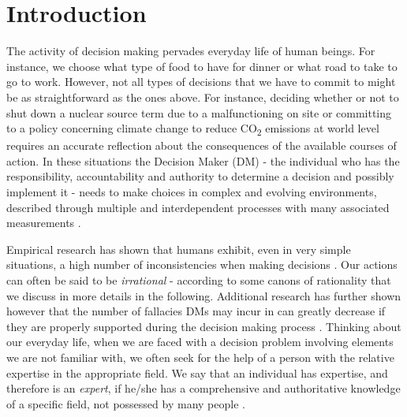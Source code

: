 
 \chapter{Introduction} %

\label{chapter1} %


The activity of decision making pervades everyday life of human beings. For instance, we choose what type of food to have for dinner or what road to take to go to work. However, not all types of decisions that we have to commit to might be as straightforward as the ones above. For instance, deciding whether or not to shut down a nuclear source term due to a malfunctioning on site or committing to a policy concerning climate change to reduce CO\textsubscript{2} emissions at world level requires an accurate reflection about the consequences of the available courses of action. In these situations the Decision Maker (DM) - the individual who has the responsibility, accountability and authority to determine a decision and possibly implement it -  needs to make choices in complex and evolving environments, described through multiple and interdependent processes with many associated measurements \citep{Bennet2009}. 

Empirical research has shown that humans exhibit, even in very simple situations, a high number of inconsistencies when making decisions  \citep{Tversky1974}. Our actions can often be said to be \textit{irrational} - according to some canons of rationality that we  discuss in more details in the following. Additional research has further shown however that the number of fallacies DMs may incur in can greatly decrease if they are properly supported during the decision making process \citep[see e.g.][]{Bhandari2008}. Thinking about our everyday life, when we are faced with a decision problem involving elements we are not familiar with, we often seek for the help of a person with the relative expertise in the appropriate field. We say that an individual has expertise, and therefore is an \textit{expert}, if he/she has a comprehensive and authoritative knowledge of a specific field, not possessed by many people \citep{Caley2014}. 

